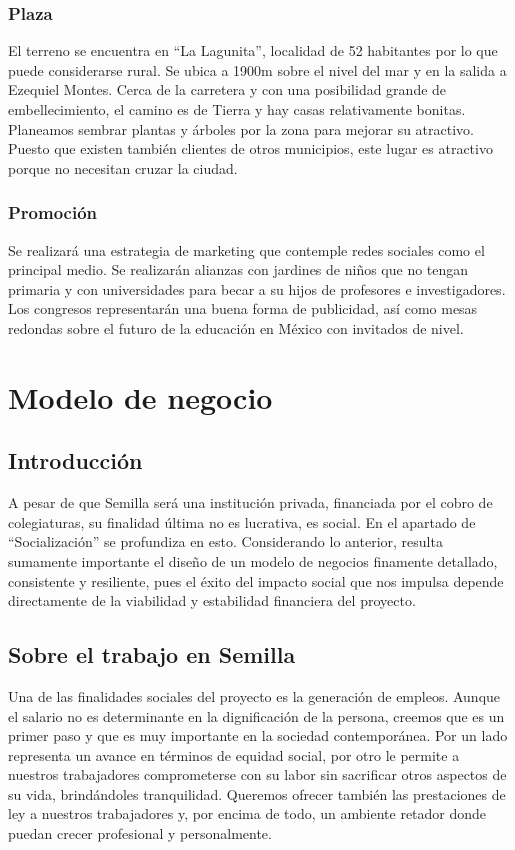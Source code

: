 \documentclass[10pt,letterpaper,oneside]{book}
\begin{document}
\subsection{Plaza}

El terreno se encuentra en ``La Lagunita'', localidad de 52 habitantes por lo que puede considerarse rural. Se ubica a  1900m sobre el nivel del mar y en la salida a Ezequiel Montes. Cerca de la carretera y con una posibilidad grande de embellecimiento, el camino es de Tierra y hay casas relativamente bonitas. Planeamos sembrar plantas y árboles por la zona para mejorar su atractivo. Puesto que existen también clientes de otros municipios, este lugar es atractivo porque no necesitan cruzar la ciudad.

\subsection{Promoción}
Se realizará una estrategia de marketing que contemple redes sociales como el principal medio. Se realizarán alianzas con jardines de niños que no tengan primaria y con universidades para becar a su hijos de profesores e investigadores. Los congresos representarán una buena forma de publicidad, así como mesas redondas sobre el futuro de la educación en México con invitados de nivel.


\chapter{Modelo de negocio}

\section{Introducción}
A pesar de que Semilla será una institución privada, financiada por el cobro de colegiaturas, su finalidad última no es lucrativa, es social. En el apartado de ``Socialización'' se profundiza en esto.  Considerando lo anterior, resulta sumamente importante el diseño de un modelo de negocios finamente detallado, consistente y resiliente, pues el éxito del impacto social que nos impulsa depende directamente de la viabilidad y estabilidad financiera del proyecto.

\section{Sobre el trabajo en Semilla}
Una de las finalidades sociales del proyecto es la generación de empleos. Aunque el salario no es determinante en la dignificación de la persona, creemos que es un primer paso y que es muy importante en la sociedad contemporánea. Por un lado representa un avance en términos de equidad social, por otro le permite a nuestros trabajadores comprometerse con su labor sin sacrificar otros aspectos de su vida, brindándoles tranquilidad. Queremos ofrecer también las prestaciones de ley a nuestros trabajadores y, por encima de todo, un ambiente retador donde puedan crecer profesional y personalmente.
\end{document}
